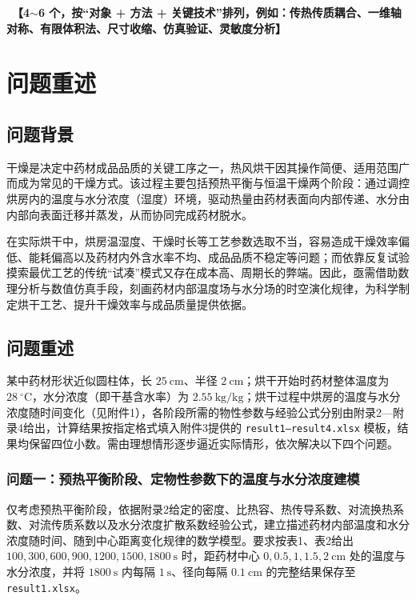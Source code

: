 \documentclass[12pt,a4paper]{article}
\newcommand{\ph}[1]{\textbf{【#1】}}                                   %
\begin{document}
\ \ph{4$\sim$6 个，按“对象 + 方法 + 关键技术”排列，例如：传热传质耦合、一维轴对称、有限体积法、尺寸收缩、仿真验证、灵敏度分析}

\clearpage

\section{问题重述}
\subsection{问题背景}
干燥是决定中药材成品品质的关键工序之一，热风烘干因其操作简便、适用范围广而成为常见的干燥方式。该过程主要包括预热平衡与恒温干燥两个阶段：通过调控烘房内的温度与水分浓度（湿度）环境，驱动热量由药材表面向内部传递、水分由内部向表面迁移并蒸发，从而协同完成药材脱水。

在实际烘干中，烘房温湿度、干燥时长等工艺参数选取不当，容易造成干燥效率偏低、能耗偏高以及药材内外含水率不均、成品品质不稳定等问题；而依靠反复试验摸索最优工艺的传统“试凑”模式又存在成本高、周期长的弊端。因此，亟需借助数理分析与数值仿真手段，刻画药材内部温度场与水分场的时空演化规律，为科学制定烘干工艺、提升干燥效率与成品质量提供依据。

\subsection{问题重述}
某中药材形状近似圆柱体，长 $25\ \mathrm{cm}$、半径 $2\ \mathrm{cm}$；烘干开始时药材整体温度为 $28\ \mathrm{^{\circ}C}$，水分浓度（即干基含水率）为 $2.55\ \mathrm{kg/kg}$；烘干过程中烘房的温度与水分浓度随时间变化（见附件1），各阶段所需的物性参数与经验公式分别由附录2—附录4给出，计算结果按指定格式填入附件3提供的 \texttt{result1—result4.xlsx} 模板，结果均保留四位小数。需由理想情形逐步逼近实际情形，依次解决以下四个问题。

\subsubsection{问题一：预热平衡阶段、定物性参数下的温度与水分浓度建模}
仅考虑预热平衡阶段，依据附录2给定的密度、比热容、热传导系数、对流换热系数、对流传质系数以及水分浓度扩散系数经验公式，建立描述药材内部温度和水分浓度随时间、随到中心距离变化规律的数学模型。要求按表1、表2给出 $100, 300, 600, 900, 1200, 1500, 1800\ \mathrm{s}$ 时，距药材中心 $0, 0.5, 1, 1.5, 2\ \mathrm{cm}$ 处的温度与水分浓度，并将 $1800\ \mathrm{s}$ 内每隔 $1\ \mathrm{s}$、径向每隔 $0.1\ \mathrm{cm}$ 的完整结果保存至 \texttt{result1.xlsx}。
\end{document}
